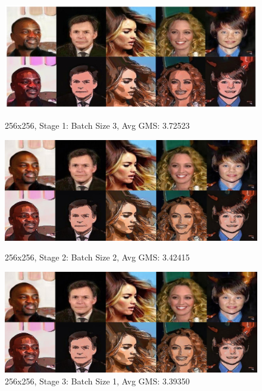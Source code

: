 \documentclass[twoside,english,notitlepage]{report}
\begin{document}
\begin{figure}[H]
    \centering
    \includegraphics[width=0.75\linewidth]{task1/top1.jpg}
    \vspace{-10pt}
    \caption{256x256, Stage 1: Batch Size 3, Avg GMS: 3.72523}
    \vspace{12pt}
    \includegraphics[width=0.75\linewidth]{task1/top3-3-42.jpg}
    \vspace{-10pt}
    \caption{256x256, Stage 2: Batch Size 2, Avg GMS: 3.42415}
    \vspace{12pt}
    \includegraphics[width=0.75\linewidth]{task1/top4-3-39.jpg}
    \vspace{-10pt}
    \caption{256x256, Stage 3: Batch Size 1, Avg GMS: 3.39350}
\end{figure}
\end{document}
